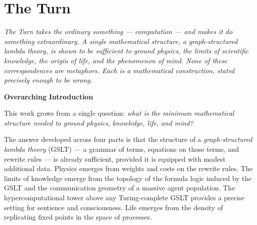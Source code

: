 \documentclass[12pt,openright,twoside]{book}
\theoremstyle{remark}
\begin{document}
\bigskip


\part{The Turn}

\vspace{1em}
\begin{mdframed}[backgroundcolor=remarkgray, linecolor=gray!60,
                 linewidth=1pt, topline=false, rightline=false,
                 bottomline=false]
\small\itshape
The Turn takes the ordinary something --- computation --- and makes it do
something extraordinary.
A single mathematical structure, a \emph{graph-structured lambda theory},
is shown to be sufficient to ground physics, the limits of scientific
knowledge, the origin of life, and the phenomenon of mind.
None of these correspondences are metaphors.
Each is a mathematical construction, stated precisely enough to be wrong.
\end{mdframed}

\bigskip

{}
{\large\bfseries\color{accentblue} Overarching Introduction}
\vspace{0.8em}

\noindent
This work grows from a single question: \emph{what is the minimum
mathematical structure needed to ground physics, knowledge, life,
and mind?}

The answer developed across four parts is that the structure of a
\emph{graph-structured lambda theory} (GSLT) --- a grammar of terms,
equations on those terms, and rewrite rules --- is already sufficient,
provided it is equipped with modest additional data.
Physics emerges from weights and costs on the rewrite rules.
The limits of knowledge emerge from the topology of the formula
logic induced by the GSLT and the communication geometry of a
massive agent population.
The hypercomputational tower above any Turing-complete GSLT
provides a precise setting for sentience and consciousness.
Life emerges from the density of replicating fixed points in the
space of processes.
\end{document}
